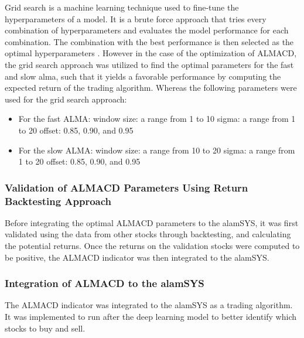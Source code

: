Grid search is a machine learning technique used to fine-tune the
hyperparameters of a model. It is a brute force approach that tries
every combination of hyperparameters and evaluates the model performance
for each combination. The combination with the best performance is
then selected as the optimal hyperparameters \cite{Joseph2018}.
However in the case of the optimization of ALMACD, the grid search
approach was utilized to find the optimal parameters for the 
fast and slow alma, such that it yields a favorable performance
by computing the expected return of the trading algorithm. Whereas
the following parameters were used for the grid search approach:
\begin{itemize}
    \item For the fast ALMA:
    \subitem window size: a range from 1 to 10
    \subitem sigma: a range from 1 to 20
    \subitem offset: 0.85, 0.90, and 0.95
    \item For the slow ALMA:
    \subitem window size: a range from 10 to 20
    \subitem sigma: a range from 1 to 20
    \subitem offset: 0.85, 0.90, and 0.95
\end{itemize}

\subsubsection{Validation of ALMACD Parameters Using Return Backtesting Approach}
\label{subsubsec:almacd_validation}
Before integrating the optimal ALMACD parameters to the alamSYS, it was
first validated using the data from other stocks through backtesting, 
and calculating the potential returns. Once the
returns on the validation stocks were computed to be positive,
the ALMACD indicator was then integrated to the alamSYS.


\subsubsection{Integration of ALMACD to the alamSYS}
\label{subsubsec:almacd_integration}
The ALMACD indicator was integrated to the alamSYS as a trading
algorithm. It was implemented to run after the deep learning model
to better identify which stocks to buy and sell.